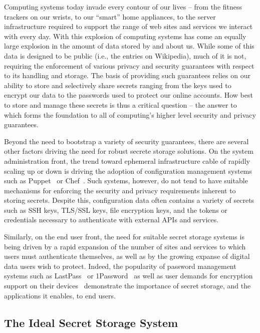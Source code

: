 Computing systems today invade every contour of our lives -- from the
fitness trackers on our wrists, to our ``smart'' home appliances, to
the server infrastructure required to support the range of web sites
and services we interact with every day. With this explosion of
computing systems has come an equally large explosion in the amount of
data stored by and about us. While some of this data is designed to be
public (i.e., the entries on Wikipedia), much of it is not, requiring
the enforcement of various privacy and security guarantees with
respect to its handling and storage. The basis of providing such
guarantees relies on our ability to store and selectively share
secrets ranging from the keys used to encrypt our data to the
passwords used to protect our online accounts. How best to store and
manage these secrets is thus a critical question -- the answer to
which forms the foundation to all of computing's higher level security
and privacy guarantees.

Beyond the need to bootstrap a variety of security guarantees, there
are several other factors driving the need for robust secrete storage
solutions. On the system administration front, the trend toward
ephemeral infrastructure cable of rapidly scaling up or down is
driving the adoption of configuration management systems such as
Puppet~\cite{puppet} or Chef~\cite{chef}. Such systems, however, do
not tend to have suitable mechanisms for enforcing the security and
privacy requirements inherent to storing secrets. Despite this,
configuration data often contains a variety of secrets such as SSH
keys, TLS/SSL keys, file encryption keys, and the tokens or
credentials necessary to authenticate with external APIs and services.

Similarly, on the end user front, the need for suitable secret storage
systems is being driven by a rapid expansion of the number of sites
and services to which users must authenticate themselves, as well as
by the growing expanse of digital data users wish to protect. Indeed,
the popularity of password management systems such as
LastPass~\cite{lastpass} or 1Password~\cite{onepassword} as well as
user demands for encryption support on their
devices~\cite{intercept-cookencryption} demonstrate the importance of
secret storage, and the applications it enables, to end users.

\subsection{The Ideal Secret Storage System}

